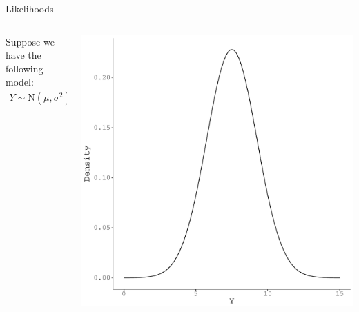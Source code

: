 \documentclass{beamer}\usepackage[]{graphicx}\usepackage[]{color}
\makeatletter
\def\maxwidth{ %
  \ifdim\Gin@nat@width>\linewidth
    \linewidth
  \else
    \Gin@nat@width
  \fi
}
\newenvironment{knitrout}{}{} %
\makeatother
\begin{document}
\begin{frame}{Likelihoods}
  
  \begin{columns}
    \begin{column}{0.5\textwidth}
      
      Suppose we have the following model:
      \begin{align*}
        Y \sim \text{N}\left( \mu, \sigma^2 \right).
      \end{align*}
      
    \end{column}
    \begin{column}{0.5\textwidth}
      
\begin{knitrout}\footnotesize
{}\color{fgcolor}

{\centering \includegraphics[width=\maxwidth]{figure/unnamed-chunk-1-1} 

}



\end{knitrout}

\end{column}
\end{columns}

\end{frame}
\end{document}

